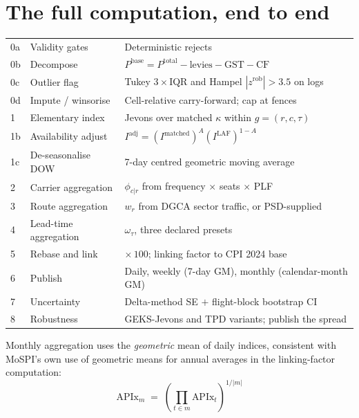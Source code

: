 \section{The full computation, end to end}

\begin{center}
\small
\begin{tabularx}{\textwidth}{@{}C{0.9cm} L{4.0cm} X@{}}
\toprule
{} &  &  \\
\midrule
0a & Validity gates & Deterministic rejects \\
0b & Decompose & $P^{\text{base}} = P^{\text{total}} - \text{levies} - \text{GST} - \text{CF}$ \\
0c & Outlier flag & Tukey $3\times$IQR and Hampel $|z^{\text{rob}}|>3.5$ on logs \\
0d & Impute / winsorise & Cell-relative carry-forward; cap at fences \\
1 & Elementary index & Jevons over matched $\kappa$ within $g=(r,c,\tau)$ \\
1b & Availability adjust & $I^{\text{adj}} = (I^{\text{matched}})^{A}(I^{\text{LAF}})^{1-A}$ \\
1c & De-seasonalise DOW & 7-day centred geometric moving average \\
2 & Carrier aggregation & $\phi_{c|r}$ from frequency $\times$ seats $\times$ PLF \\
3 & Route aggregation & $w_r$ from DGCA sector traffic, or PSD-supplied \\
4 & Lead-time aggregation & $\omega_\tau$, three declared presets \\
5 & Rebase and link & $\times\,100$; linking factor to CPI 2024 base \\
6 & Publish & Daily, weekly (7-day GM), monthly (calendar-month GM) \\
7 & Uncertainty & Delta-method SE $+$ flight-block bootstrap CI \\
8 & Robustness & GEKS-Jevons and TPD variants; publish the spread \\
\bottomrule
\end{tabularx}
\end{center}

\noindent Monthly aggregation uses the \emph{geometric} mean of daily indices, consistent
with MoSPI's own use of geometric means for annual averages in the linking-factor
computation:
\begin{equation}
\text{APIx}_m \;=\; \left(\prod_{t\in m}\text{APIx}_t\right)^{1/|m|}
\end{equation}
